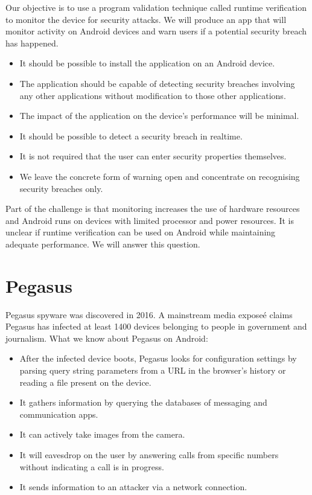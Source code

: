 Our objective is to use a program validation technique called runtime verification to monitor the device for security attacks.  We will produce an app that will monitor activity on Android devices and warn users if a potential security breach has happened.

\begin{itemize}
\item It should be possible to install the application on an Android device.
\item The application should be capable of detecting security breaches involving any other applications without modification to those other applications.
\item The impact of the application on the device's performance will be minimal.
\item It should be possible to detect a security breach in realtime.
\item It is not required that the user can enter security properties themselves.
\item We leave the concrete form of warning open and concentrate on recognising security breaches only.
\end{itemize}

Part of the challenge is that monitoring increases the use of hardware resources and Android runs on devices with limited processor and power resources.  It is unclear if runtime verification can be used on Android while maintaining adequate performance.  We will answer this question.

\section{Pegasus}


Pegasus spyware was discovered in 2016.  A mainstream media expose\'e \cite{PegasusGuardian} claims Pegasus has infected at least 1400 devices belonging to people in government and journalism.  What we know about Pegasus on Android\cite{PegasusOnAndroid}:

\begin{itemize}
\item After the infected device boots, Pegasus looks for configuration settings by parsing query string parameters from a URL in the browser's history or reading a file present on the device.
\item It gathers information by querying the databases of messaging and communication apps.
\item It can actively take images from the camera.
\item It will eavesdrop on the user by answering calls from specific numbers without indicating a call is in progress.
\item It sends information to an attacker via a network connection.
\end{itemize}

